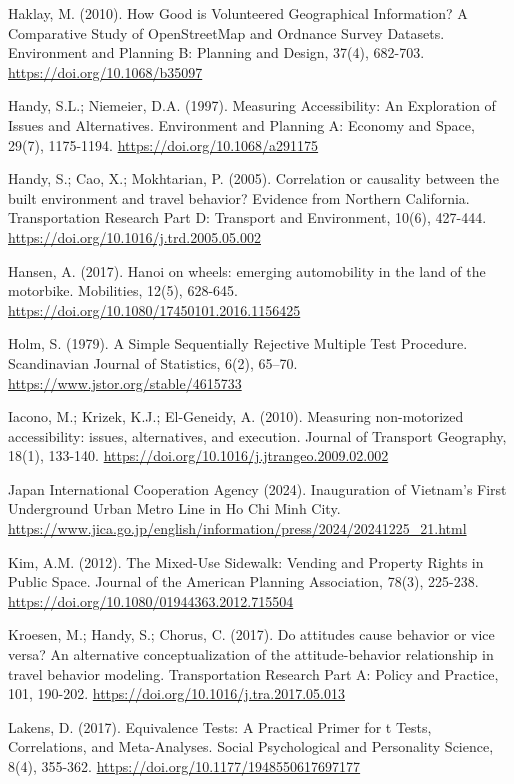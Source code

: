 \documentclass[
  11pt,
  a4paper,
]{article}
\begin{document}
Haklay, M. (2010). How Good is Volunteered Geographical Information? A
Comparative Study of OpenStreetMap and Ordnance Survey Datasets.
Environment and Planning B: Planning and Design, 37(4), 682-703.
\url{https://doi.org/10.1068/b35097}

Handy, S.L.; Niemeier, D.A. (1997). Measuring Accessibility: An
Exploration of Issues and Alternatives. Environment and Planning A:
Economy and Space, 29(7), 1175-1194.
\url{https://doi.org/10.1068/a291175}

Handy, S.; Cao, X.; Mokhtarian, P. (2005). Correlation or causality
between the built environment and travel behavior? Evidence from
Northern California. Transportation Research Part D: Transport and
Environment, 10(6), 427-444.
\url{https://doi.org/10.1016/j.trd.2005.05.002}

Hansen, A. (2017). Hanoi on wheels: emerging automobility in the land of
the motorbike. Mobilities, 12(5), 628-645.
\url{https://doi.org/10.1080/17450101.2016.1156425}

Holm, S. (1979). A Simple Sequentially Rejective Multiple Test
Procedure. Scandinavian Journal of Statistics, 6(2), 65--70.
\url{https://www.jstor.org/stable/4615733}

Iacono, M.; Krizek, K.J.; El-Geneidy, A. (2010). Measuring non-motorized
accessibility: issues, alternatives, and execution. Journal of Transport
Geography, 18(1), 133-140.
\url{https://doi.org/10.1016/j.jtrangeo.2009.02.002}

Japan International Cooperation Agency (2024). Inauguration of Vietnam's
First Underground Urban Metro Line in Ho Chi Minh City.
\url{https://www.jica.go.jp/english/information/press/2024/20241225_21.html}

Kim, A.M. (2012). The Mixed-Use Sidewalk: Vending and Property Rights in
Public Space. Journal of the American Planning Association, 78(3),
225-238. \url{https://doi.org/10.1080/01944363.2012.715504}

Kroesen, M.; Handy, S.; Chorus, C. (2017). Do attitudes cause behavior
or vice versa? An alternative conceptualization of the attitude-behavior
relationship in travel behavior modeling. Transportation Research Part
A: Policy and Practice, 101, 190-202.
\url{https://doi.org/10.1016/j.tra.2017.05.013}

Lakens, D. (2017). Equivalence Tests: A Practical Primer for t Tests,
Correlations, and Meta-Analyses. Social Psychological and Personality
Science, 8(4), 355-362. \url{https://doi.org/10.1177/1948550617697177}
\end{document}
